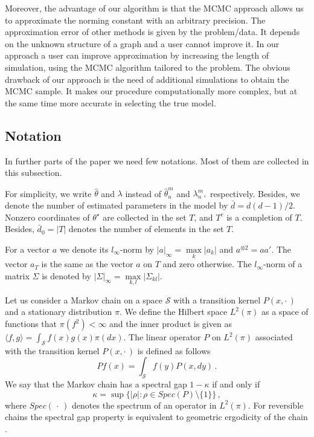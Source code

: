 \documentclass[twoside,11pt]{article}
\def\th{\theta}
\def\ths{\th^\star}
\def\hth{\hat{\theta}}
\begin{document}
Moreover, the advantage of our algorithm is that the MCMC approach allows us to approximate the norming constant with an arbitrary precision. The approximation error of other methods is given by the problem/data. It depends on the unknown structure of a graph and a user cannot improve it. In our approach a user can improve approximation by increasing the length of simulation, using the MCMC algorithm tailored to the problem. 
The obvious drawback of our approach is the need of additional simulations to obtain the MCMC sample. It makes our procedure computationally more complex, but at the same time more accurate in selecting the true model. 


\subsection{Notation}
\label{notation}

In further parts of the paper we need few notations. Most of them are collected in this subsection.

For simplicity, we write $\hth$ and $\lambda$ instead of $\hth _n^m$ and $\lambda_n^m,$ respectively.  Besides, we denote the number of estimated parameters in the model by $\bar{d} = d(d-1)/2.$ Nonzero coordinates of $\ths$ are collected in the set $T$, and $T^c$ is a completion of $T.$ Besides, 
$\bar{d}_0 = |T|$ denotes the number of elements in the set $T.$

For a vector $a$ we denote its $l_\infty$-norm by $|a|_\infty = \max\limits_k |a_k|$ and $a^{\otimes 2}=aa'.$ The vector $a_T$ is the same as the vector $a$ on $T$ and zero otherwise. The  $l_\infty$-norm of a matrix $\Sigma$ is denoted by $|\Sigma|_\infty= \max\limits_{k,l} |\Sigma_{kl}|.$ 

Let us consider a Markov chain on a space $\mathcal{S}$ with a transition kernel $P(x,\cdot\,)$ and a stationary distribution $\pi$. We define the Hilbert space $L^2(\pi)$ as a space of functions that $\pi(f^2)<\infty$ and the 
inner product is given as $\langle f,g\rangle=\int_\mathcal{S} f(x)g(x)\pi(dx)$. The linear operator $P$ on $L^2(\pi)$ associated with the transition kernel $P(x,\cdot\,)$ is defined as follows
\[Pf(x)=\int_\mathcal{S} f(y)P(x,dy)\,.\]
We say that the Markov chain has a spectral gap $1-\kappa$ if and only if \[\kappa=\sup\{|\rho|\colon \rho\in Spec(P)\setminus \{1\}\}\,,\]
where $Spec(\,\cdot\,)$ denotes the spectrum of an operator in $L^2(\pi)$. For reversible chains the spectral gap property is equivalent to geometric ergodicity of the chain \citep{kontoyiannis2009geometric,roberts1997geometric}.
\end{document}
